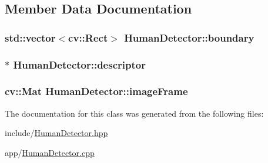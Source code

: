 \subsection{Member Data Documentation}
\subsubsection[{\texorpdfstring{boundary}{boundary}}]{\setlength{\rightskip}{0pt plus 5cm}std\+::vector$<$cv\+::\+Rect$>$ Human\+Detector\+::boundary\hspace{0.3cm}{\ttfamily [private]}}\hypertarget{classHumanDetector_acbdcb52dde539827a65d86829cc90ce3}{}\label{classHumanDetector_acbdcb52dde539827a65d86829cc90ce3}
\subsubsection[{\texorpdfstring{descriptor}{descriptor}}]{$\ast$ Human\+Detector\+::descriptor\hspace{0.3cm}{\ttfamily [private]}}\hypertarget{classHumanDetector_a920f67ab988786133b5fd478a0711965}{}\label{classHumanDetector_a920f67ab988786133b5fd478a0711965}
\subsubsection[{\texorpdfstring{image\+Frame}{imageFrame}}]{\setlength{\rightskip}{0pt plus 5cm}cv\+::\+Mat Human\+Detector\+::image\+Frame\hspace{0.3cm}{\ttfamily [private]}}\hypertarget{classHumanDetector_a5a075756a9b9ff4f0fa9fcd5fbe757b8}{}\label{classHumanDetector_a5a075756a9b9ff4f0fa9fcd5fbe757b8}


The documentation for this class was generated from the following files\+:\begin{DoxyCompactItemize}
\item 
include/\hyperlink{HumanDetector_8hpp}{Human\+Detector.\+hpp}\item 
app/\hyperlink{HumanDetector_8cpp}{Human\+Detector.\+cpp}\end{DoxyCompactItemize}
